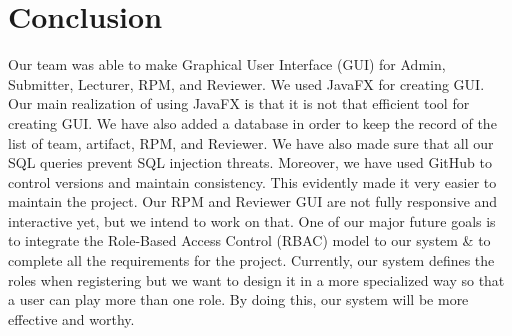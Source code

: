 %
\chapter{Conclusion}
\label{sec:conclusion}

Our team was able to make Graphical User Interface (GUI) for Admin, Submitter, Lecturer, RPM, and Reviewer. We used JavaFX for creating GUI. Our main realization of using JavaFX is that it is not that efficient tool for creating GUI. We have also added a database in order to keep the record of the list of team, artifact, RPM, and Reviewer. We have also made sure that all our SQL queries prevent SQL injection threats. Moreover, we have used GitHub to control versions and maintain consistency. This evidently made it very easier to maintain the project. Our RPM and Reviewer GUI are not fully responsive and interactive yet, but we intend to work on that. One of our major future goals is to integrate the Role-Based Access Control (RBAC) model to our system \& to complete all the requirements for the project. Currently, our system defines the roles when registering but we want to design it in a more specialized way so that a user can play more than one role. By doing this, our system will be more effective and worthy.